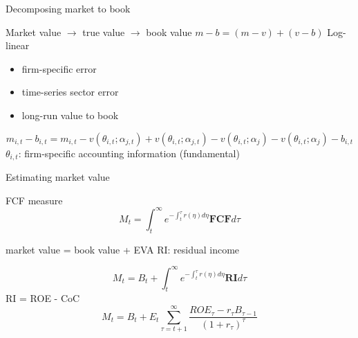 \documentclass[aspectratio=169,xcolor=dvipsnames]{beamer}
\begin{document}
\begin{frame}{Decomposing market to book}
    \begin{block}{Market value $\rightarrow$ true value $\rightarrow$ book value}
        $m - b = (m - v) + (v - b)$
        Log-linear
    \end{block}
    \begin{itemize}
        \item firm-specific error
        \item time-series sector error
        \item long-run value to book
    \end{itemize}
    \begin{equation}
        m_{i,t} - b_{i,t} = m_{i,t} - v(\theta_{i,t}; \alpha_{j,t}) + v(\theta_{i,t}; \alpha_{j,t}) - v(\theta_{i,t}; \alpha_{j}) - v(\theta_{i,t}; \alpha_j) - b_{i,t}
    \end{equation}
    $\theta_{i,t}$: firm-specific accounting information (fundamental)
\end{frame}

\begin{frame}{Estimating market value}
    \begin{block}{FCF measure}
        \begin{equation}
            M_t = \int_{t}^{\infty} e^{-\int_{t}^{\tau} r(\eta)d \eta} \textbf{FCF} d \tau
        \end{equation}
    \end{block}
    market value = book value + EVA
    RI: residual income

    \begin{equation}
        M_t = B_t + \int_{t}^{\infty} e^{-\int_{t}^{\tau} r(\eta)d \eta} \textbf{RI} d \tau
    \end{equation}
    RI = ROE - CoC
    \begin{equation}
        M_t = B_t + E_t \sum_{\tau = t+1}^{\infty} \frac{ROE_{\tau} - r_{\tau} B_{\tau - 1}}{(1+r_{\tau})^{\tau}}
    \end{equation}
\end{frame}
\end{document}

